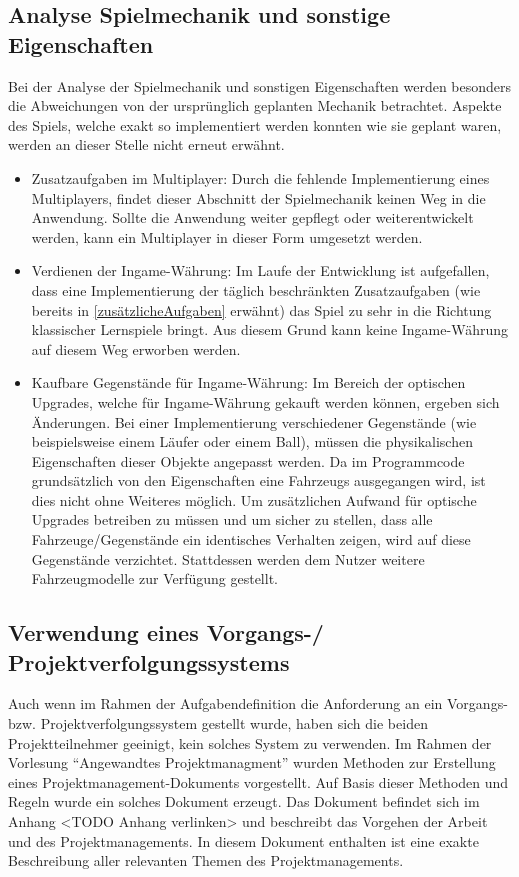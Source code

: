 \subsection{Analyse Spielmechanik und sonstige Eigenschaften}
Bei der Analyse der Spielmechanik und sonstigen Eigenschaften werden besonders die Abweichungen von der ursprünglich geplanten Mechanik betrachtet. Aspekte des Spiels, welche exakt so implementiert werden konnten wie sie geplant waren, werden an dieser Stelle nicht erneut erwähnt.
\begin{itemize}
    \item{Zusatzaufgaben im Multiplayer: Durch die fehlende Implementierung eines Multiplayers, findet dieser Abschnitt der Spielmechanik keinen Weg in die Anwendung. Sollte die Anwendung weiter gepflegt oder weiterentwickelt werden, kann ein Multiplayer in dieser Form umgesetzt werden.}
    \item{Verdienen der Ingame-Währung: Im Laufe der Entwicklung ist aufgefallen, dass eine Implementierung der täglich beschränkten Zusatzaufgaben (wie bereits in \ref{zusätzlicheAufgaben} erwähnt) das Spiel zu sehr in die Richtung klassischer Lernspiele bringt. Aus diesem Grund kann keine Ingame-Währung auf diesem Weg erworben werden.}
    \item{Kaufbare Gegenstände für Ingame-Währung: Im Bereich der optischen Upgrades, welche für Ingame-Währung gekauft werden können, ergeben sich Änderungen. Bei einer Implementierung verschiedener Gegenstände (wie beispielsweise einem Läufer oder einem Ball), müssen die physikalischen Eigenschaften dieser Objekte angepasst werden. Da im Programmcode grundsätzlich von den Eigenschaften eine Fahrzeugs ausgegangen wird, ist dies nicht ohne Weiteres möglich. Um zusätzlichen Aufwand für optische Upgrades betreiben zu müssen und um sicher zu stellen, dass alle Fahrzeuge/Gegenstände ein identisches Verhalten zeigen, wird auf diese Gegenstände verzichtet. Stattdessen werden dem Nutzer weitere Fahrzeugmodelle zur Verfügung gestellt.}
\end{itemize}

\subsection{Verwendung eines Vorgangs-/ Projektverfolgungssystems}
Auch wenn im Rahmen der Aufgabendefinition die Anforderung an ein Vorgangs- bzw. Projektverfolgungssystem gestellt wurde, haben sich die beiden Projektteilnehmer geeinigt, kein solches System zu verwenden.
Im Rahmen der Vorlesung \enquote{Angewandtes Projektmanagment} wurden Methoden zur Erstellung eines Projektmanagement-Dokuments vorgestellt. Auf Basis dieser Methoden und Regeln wurde ein solches Dokument erzeugt. Das Dokument befindet sich im Anhang <TODO Anhang verlinken> und beschreibt das Vorgehen der Arbeit und des Projektmanagements. In diesem Dokument enthalten ist eine exakte Beschreibung aller relevanten Themen des Projektmanagements.

